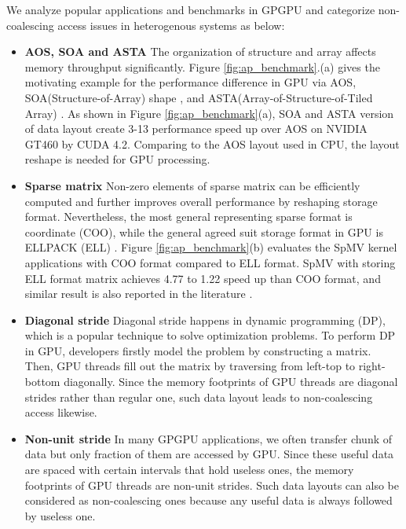 \documentclass[10pt,journal,compsoc]{IEEEtran}
\begin{document}
We analyze popular applications and benchmarks \cite{rodinia:} in GPGPU and categorize
non-coalescing access issues in heterogenous systems as below:

\begin{itemize}
  \item \textbf{AOS, SOA and ASTA} The organization of structure and array affects memory throughput significantly. Figure \ref{fig:ap_benchmark}.(a) gives the motivating example for the performance
difference in GPU via AOS, SOA(Structure-of-Array) shape \cite{MemoryAccessPattern}, and
ASTA(Array-of-Structure-of-Tiled Array) \cite{ASTA}.
As shown in Figure \ref{fig:ap_benchmark}(a), SOA and ASTA version of data layout create 3-13 performance speed up over AOS on NVIDIA GT460 by CUDA 4.2.
Comparing to the AOS layout used in CPU, the layout reshape is needed for GPU processing.
  \item \textbf{Sparse matrix} Non-zero elements of sparse matrix can be efficiently computed and further improves overall performance by
reshaping storage format. Nevertheless, the most general representing sparse format is coordinate (COO), while
the general agreed suit storage format in GPU is ELLPACK (ELL) \cite{AdELL}\cite{AutoSpMV}.
Figure \ref{fig:ap_benchmark}(b) evaluates the SpMV kernel applications with COO format compared to ELL format.
SpMV with storing ELL format matrix achieves 4.77 to 1.22 speed up than COO format, and similar result is also reported in the literature \cite{spmv_CUDA}.
  \item \textbf{Diagonal stride} Diagonal stride happens in dynamic programming (DP), which is a popular technique to solve optimization problems. To perform DP in GPU,
developers firstly model the problem by constructing a matrix. Then, GPU threads fill out the matrix
by traversing from left-top to right-bottom diagonally. Since the memory footprints of GPU threads are
diagonal strides rather than regular one, such data layout leads to non-coalescing access likewise.
  \item \textbf{Non-unit stride} In many GPGPU applications, we often transfer chunk of data but only fraction of them are accessed by GPU. Since these useful data are spaced with certain intervals that hold useless ones, the memory footprints of GPU threads are non-unit strides. Such data layouts can also be considered as non-coalescing ones because any useful data is always followed by useless one.
\end{itemize}
\end{document}
